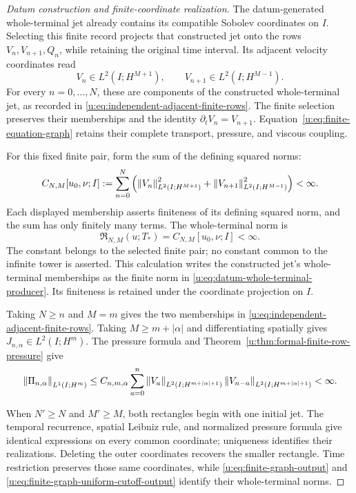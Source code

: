 \begin{proof}[Datum construction and finite-coordinate realization]
The datum-generated whole-terminal jet already contains its compatible
Sobolev coordinates on \(I\). Selecting this finite record projects that
constructed jet onto the rows \(V_n,V_{n+1},Q_n\), while retaining the
original time interval. Its adjacent velocity coordinates read
\[
 V_n\in L^2(I;H^{M+1}),
 \qquad
 V_{n+1}\in L^2(I;H^{M-1}).
\]
For every \(n=0,\ldots,N\), these are components of the constructed
whole-terminal jet, as recorded in
\eqref{u:eq:independent-adjacent-finite-rows}. The finite selection preserves
their memberships and the identity \(\partial_tV_n=V_{n+1}\).
Equation~\eqref{u:eq:finite-equation-graph} retains their complete
transport, pressure, and viscous coupling.

For this fixed finite pair, form the sum of the defining squared norms:
\begin{equation}
 C_{N,M}[u_0,\nu;I]
 :=\sum_{n=0}^{N}\left(
  \left\lVert V_n\right\rVert_{L^2(I;H^{M+1})}^2
  +\left\lVert V_{n+1}\right\rVert_{L^2(I;H^{M-1})}^2
 \right)<\infty.
 \label{u:eq:finite-graph-output}
\end{equation}
Each displayed membership asserts finiteness of its defining squared norm,
and the sum has only finitely many terms.
The whole-terminal norm is
\begin{equation}
 \mathfrak R_{N,M}(u;T_*)
 =C_{N,M}[u_0,\nu;I]<\infty.
 \label{u:eq:finite-graph-uniform-cutoff-output}
\end{equation}
The constant belongs to the selected finite pair; no constant common to the
infinite tower is asserted. This calculation writes the constructed jet's
whole-terminal memberships as the finite norm in
\eqref{u:eq:datum-whole-terminal-producer}. Its finiteness is retained under
the coordinate projection on \(I\).

Taking \(N\ge n\) and \(M=m\) gives the two memberships in
\eqref{u:eq:independent-adjacent-finite-rows}.  Taking
\(M\ge m+|\alpha|\) and differentiating spatially gives
\(J_{n,\alpha}\in L^2(I;H^m)\).  The pressure formula and
Theorem~\ref{u:thm:formal-finite-row-pressure} give
\[
 \left\lVert \Pi_{n,\alpha}\right\rVert_{L^1(I;H^m)}
 \le C_{n,m,\alpha}
 \sum_{a=0}^{n}
 \left\lVert V_a\right\rVert_{L^2(I;H^{m+|\alpha|+1})}
 \left\lVert V_{n-a}\right\rVert_{L^2(I;H^{m+|\alpha|+1})}<\infty.
\]

When \(N'\ge N\) and \(M'\ge M\), both rectangles begin with one initial
jet.  The temporal recurrence, spatial Leibniz rule, and normalized pressure
formula give identical expressions on every common coordinate; uniqueness
identifies their realizations.  Deleting the outer coordinates
recovers the smaller rectangle.  Time restriction preserves those same
coordinates, while \eqref{u:eq:finite-graph-output} and
\eqref{u:eq:finite-graph-uniform-cutoff-output} identify their
whole-terminal norms.
\end{proof}

